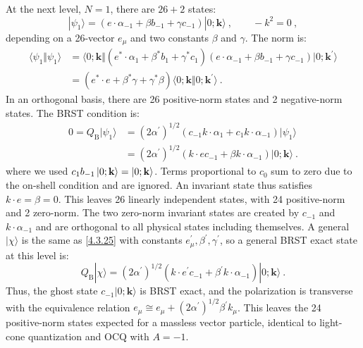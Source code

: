 At the next level, $N=1$, there are $26+2$ states:
\begin{equation}
|\psi_{1}\rangle= (e \cdot \alpha_{-1}+\beta b_{-1}+\gamma c_{-1})|0 ; \mathbf{k}\rangle\:, \qquad -k^{2}=0 \:, \label{4.3.25}
\end{equation}
depending on a 26-vector $e_{\mu}$ and two constants $\beta$ and $\gamma$. The norm is:
\begin{align}
\langle\psi_{1} \Vert \psi_{1}\rangle &= \langle 0 ; \mathbf{k} \Vert (e^{*} \cdot \alpha_{1}+\beta^{*} b_{1}+\gamma^{*} c_{1})
(e \cdot \alpha_{-1}+\beta b_{-1}+\gamma c_{-1}) \vert 0 ; \mathbf{k}^{\prime}\rangle  \nonumber \\
&=(e^{*} \cdot e+\beta^{*} \gamma+\gamma^{*} \beta) \langle 0 ; \mathbf{k} \Vert 0 ; \mathbf{k}^{\prime}\rangle \:. \label{4.3.26}
\end{align}
In an orthogonal basis, there are 26 positive-norm states and 2 negative-norm states. The BRST condition is:
\begin{align}
0=Q_{\mathrm{B}}|\psi_{1}\rangle &= (2 \alpha^{\prime})^{1 / 2} (c_{-1} k \cdot \alpha_{1}+c_{1} k \cdot \alpha_{-1})|\psi_{1}\rangle \nonumber  \\
&=(2 \alpha^{\prime})^{1 / 2}(k \cdot e c_{-1}+\beta k \cdot \alpha_{-1})|0 ; \mathbf{k}\rangle  \:. \label{4.3.27}
\end{align}
where we used $c_1b_{-1}\ket{0; \mathbf{k}}=\ket{0; \mathbf{k}}$. Terms proportional to $c_{0}$ sum to zero due to the on-shell condition and are ignored. An invariant state thus satisfies $k \cdot e=\beta=0$. This leaves 26 linearly independent states, with 24 positive-norm and 2 zero-norm. The two zero-norm invariant states are created by $c_{-1}$ and $k \cdot \alpha_{-1}$ and are orthogonal to all physical states including themselves. A general $|\chi\rangle$ is the same as \eqref{4.3.25} with constants $e_{\mu}^{\prime}, \beta^{\prime}, \gamma^{\prime}$, so a general BRST exact state at this level is:
\begin{equation}
Q_{\mathrm{B}}|\chi\rangle= (2 \alpha^{\prime})^{1 / 2} (k \cdot e^{\prime} c_{-1}+\beta^{\prime} k \cdot \alpha_{-1})|0 ; \mathbf{k}\rangle \:. \label{4.3.28}
\end{equation}
Thus, the ghost state $c_{-1}|0 ; \mathbf{k}\rangle$ is BRST exact, and the polarization is transverse with the equivalence relation $e_{\mu} \cong e_{\mu}+(2 \alpha^{\prime})^{1 / 2} \beta^{\prime} k_{\mu}$. This leaves the 24 positive-norm states expected for a massless vector particle, identical to light-cone quantization and OCQ with $A=-1$.

